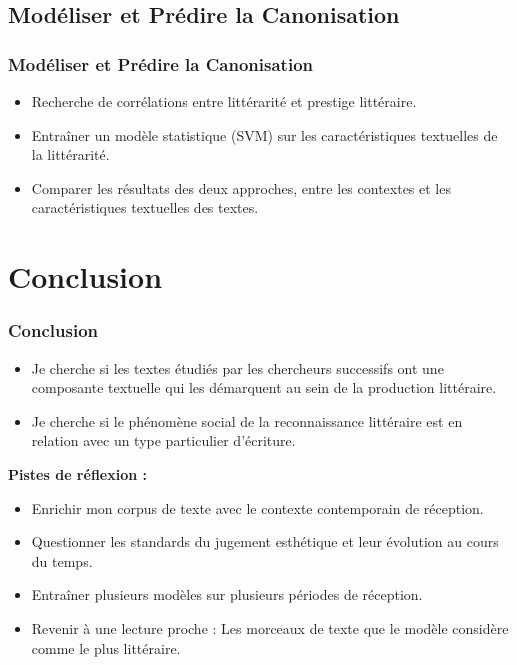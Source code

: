 \documentclass{beamer}
\begin{document}
\subsection{Modéliser et Prédire la Canonisation}

\begin{frame}
\frametitle{Modéliser et Prédire la Canonisation}

\begin{itemize}
    \item Recherche de corrélations entre littérarité et prestige littéraire.
    \item Entraîner un modèle statistique (SVM) sur les caractéristiques textuelles de la littérarité.
    \item Comparer les résultats des deux approches, entre les contextes et les caractéristiques textuelles des textes. 
\end{itemize}

\end{frame}

\section{Conclusion}

\begin{frame}
\frametitle{Conclusion}
\begin{itemize}
    \item Je cherche si les textes étudiés par les chercheurs successifs ont une composante textuelle qui les démarquent au sein de la production littéraire.
    \item Je cherche si le phénomène social de la reconnaissance littéraire est en relation avec un type particulier d'écriture. 
\end{itemize}

\textbf{Pistes de réflexion :}
\begin{itemize}
    \item Enrichir mon corpus de texte avec le contexte contemporain de réception.
    \item Questionner les standards du jugement esthétique et leur évolution au cours du temps.
    \item Entraîner plusieurs modèles sur plusieurs périodes de réception. 
    \item Revenir à une lecture proche : Les morceaux de texte que le modèle considère comme le plus littéraire.
\end{itemize}

\end{frame}
\end{document}
